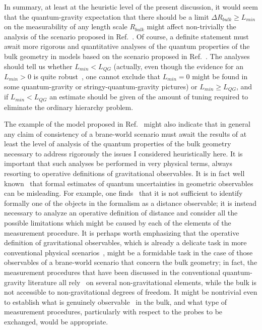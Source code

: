 In summary, at least at the heuristic level of the present
discussion, it would seem that the quantum-gravity expectation
that there should be a limit $\Delta R_{bulk} \ge L_{min}$
on the measurability of any length scale $R_{bulk}$
might affect non-trivially the analysis of
the scenario proposed in Ref.~\cite{rs1}.
Of course, a definite statement must await
more rigorous and quantitative analyses of the  
quantum properties of the bulk geometry
in models based on the scenario proposed in Ref.~\cite{rs1}.
The analyses should tell us whether 
$L_{min} < L_{QG}$ (actually, even though the evidence 
for an $L_{min} > 0$ is
quite robust~\cite{wheely,venekonmen,padma,dharam94grf,gacmpla,dbrscatt},
one cannot exclude that $L_{min} = 0$ might be found in some
quantum-gravity or stringy-quantum-gravity pictures)
or $L_{min} \ge L_{QG}$, and if $L_{min} < L_{QG}$ 
an estimate should be given of the amount of tuning
required to eliminate the ordinary hierarchy problem.

The example of the model proposed in Ref.~\cite{rs1} 
might also indicate that in general any claim of
consistency of a brane-world scenario must await 
the results of at least 
the level of analysis of the
quantum properties of the bulk geometry
necessary to address rigorously the issues I considered 
heuristically here.
It is important that such analyses be performed in
very physical terms, always resorting to
operative definitions of gravitational observables.
It is in fact well 
known~\cite{dharam94grf,gacmpla,bergstac} that formal 
estimates of quantum uncertainties in geometric observables
can be misleading.
For example, one finds~\cite{dharam94grf,gacmpla,bergstac}
that it is not sufficient to identify formally one of 
the objects in the formalism as a distance observable;
it is instead necessary to analyze an operative
definition of distance and consider all the
possible limitations which might be caused by each of the 
elements of the measurement procedure.
It is perhaps worth emphasizing that the operative
definition of gravitational observables, which is already
a delicate task in more conventional physical 
scenarios~\cite{gacmpla,bergstac,rovellimrs},
might be a formidable task in the case of those observables
of a brane-world scenario that concern the bulk geometry;
in fact, the measurement procedures that have been discussed 
in the conventional quantum-gravity
literature all rely~\cite{gacmpla,bergstac,rovellimrs}
on several non-gravitational elements, while the bulk
is not accessible to non-gravitational degrees of freedom.
It might be nontrivial even to establish what is 
genuinely observable~\cite{rovellimrs}
in the bulk, and what type of measurement procedures, particularly
with respect to the probes to be exchanged, 
would be appropriate.

